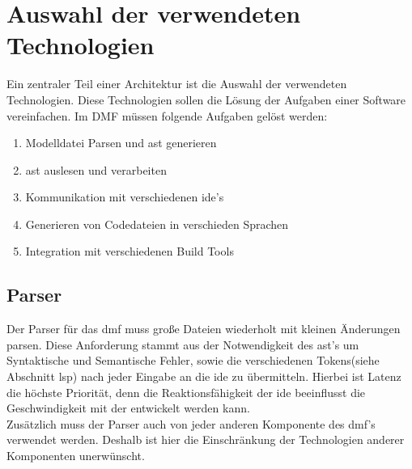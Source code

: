 \documentclass[./einleitung.tex]{subfiles}
\begin{document}
\section{Auswahl der verwendeten Technologien}\label{sec:auswahl-der-verwendeten-technologien}
Ein zentraler Teil einer Architektur ist die Auswahl der verwendeten Technologien.
Diese Technologien sollen die Lösung der Aufgaben einer Software vereinfachen.
\newline
Im DMF müssen folgende Aufgaben gelöst werden:
\begin{enumerate}
\item Modelldatei Parsen und \acrshort{ast} generieren
\item \acrshort{ast} auslesen und verarbeiten
\item Kommunikation mit verschiedenen \acrshort{ide}'s
\item Generieren von Codedateien in verschieden Sprachen
\item Integration mit verschiedenen Build Tools
\end{enumerate}
\subsection{Parser}
Der Parser für das \acrshort{dmf} muss große Dateien wiederholt mit kleinen Änderungen parsen.
Diese Anforderung stammt aus der Notwendigkeit des \acrshort{ast}'s um Syntaktische und Semantische Fehler, sowie die verschiedenen Tokens(siehe Abschnitt \acrshort{lsp}) nach jeder Eingabe an die \acrshort{ide} zu übermitteln.
Hierbei ist Latenz die höchste Priorität, denn die Reaktionsfähigkeit der \acrshort{ide} beeinflusst die Geschwindigkeit mit der entwickelt werden kann. \\
Zusätzlich muss der Parser auch von jeder anderen Komponente des \acrshort{dmf}'s verwendet werden.
Deshalb ist hier die Einschränkung der Technologien anderer Komponenten unerwünscht.
\end{document}
